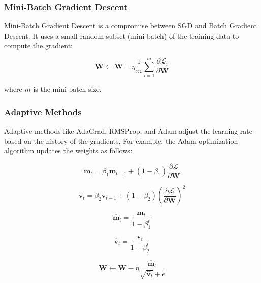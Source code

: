\documentclass{report}
\begin{document}
            \subsubsection{Mini-Batch Gradient Descent}
            
            Mini-Batch Gradient Descent is a compromise between SGD and Batch Gradient Descent. It uses a small random subset (mini-batch) of the training data to compute the gradient:
            
            \begin{equation}
            \mathbf{W} \leftarrow \mathbf{W} - \eta \frac{1}{m} \sum_{i=1}^m \frac{\partial \mathcal{L}_i}{\partial \mathbf{W}}
            \end{equation}
            
            where \( m \) is the mini-batch size.
            
            \subsubsection{Adaptive Methods}
            
            Adaptive methods like AdaGrad, RMSProp, and Adam adjust the learning rate based on the history of the gradients. For example, the Adam optimization algorithm updates the weights as follows:
            
            \begin{equation}
            \mathbf{m}_t = \beta_1 \mathbf{m}_{t-1} + (1 - \beta_1) \frac{\partial \mathcal{L}}{\partial \mathbf{W}}
            \end{equation}
            
            \begin{equation}
            \mathbf{v}_t = \beta_2 \mathbf{v}_{t-1} + (1 - \beta_2) \left( \frac{\partial \mathcal{L}}{\partial \mathbf{W}} \right)^2
            \end{equation}
            
            \begin{equation}
            \hat{\mathbf{m}}_t = \frac{\mathbf{m}_t}{1 - \beta_1^t}
            \end{equation}
            
            \begin{equation}
            \hat{\mathbf{v}}_t = \frac{\mathbf{v}_t}{1 - \beta_2^t}
            \end{equation}
            
            \begin{equation}
            \mathbf{W} \leftarrow \mathbf{W} - \eta \frac{\hat{\mathbf{m}}_t}{\sqrt{\hat{\mathbf{v}}_t} + \epsilon}
            \end{equation}
            
\end{document}
